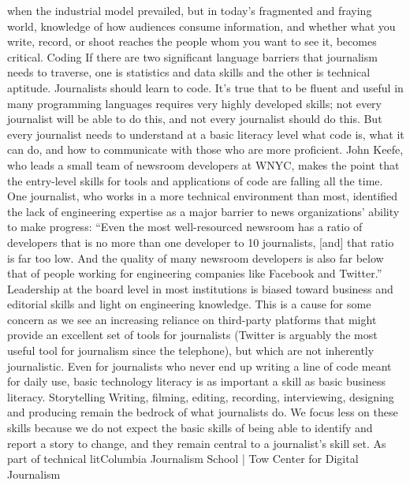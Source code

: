when the industrial model prevailed, but in today’s fragmented and fraying world,
knowledge of how audiences consume information, and whether what you write,
record, or shoot reaches the people whom you want to see it, becomes critical.
Coding
If there are two significant language barriers that journalism needs to traverse,
one is statistics and data skills and the other is technical aptitude. Journalists
should learn to code. It’s true that to be fluent and useful in many programming
languages requires very highly developed skills; not every journalist will be able
to do this, and not every journalist should do this. But every journalist needs
to understand at a basic literacy level what code is, what it can do, and how to
communicate with those who are more proficient. John Keefe, who leads a small
team of newsroom developers at WNYC, makes the point that the entry-level
skills for tools and applications of code are falling all the time.
One journalist, who works in a more technical environment than most, identified
the lack of engineering expertise as a major barrier to news organizations’
ability to make progress: ``Even the most well-resourced newsroom has a ratio of
developers that is no more than one developer to 10 journalists, [and] that ratio
is far too low. And the quality of many newsroom developers is also far below
that of people working for engineering companies like Facebook and Twitter.''
Leadership at the board level in most institutions is biased toward business and
editorial skills and light on engineering knowledge. This is a cause for some concern
as we see an increasing reliance on third-party platforms that might provide
an excellent set of tools for journalists (Twitter is arguably the most useful tool
for journalism since the telephone), but which are not inherently journalistic.
Even for journalists who never end up writing a line of code meant for daily use,
basic technology literacy is as important a skill as basic business literacy.
Storytelling
Writing, filming, editing, recording, interviewing, designing and producing
remain the bedrock of what journalists do. We focus less on these skills because
we do not expect the basic skills of being able to identify and report a story to
change, and they remain central to a journalist’s skill set. As part of technical litColumbia
Journalism School | Tow Center for Digital Journalism

